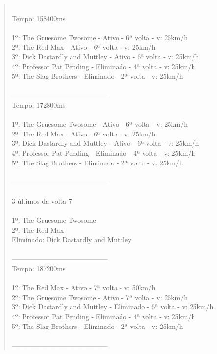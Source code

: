 \documentclass[paper=a4, fontsize=11pt]{scrartcl}
\numberwithin{equation}{section}		%
\numberwithin{figure}{section}			%
\numberwithin{table}{section}				%
\begin{document}
\begin{quote}
\\Tempo: 158400ms
\\
\\1º: The Gruesome Twosome - Ativo - 6ª volta - v: 25km/h
\\2º: The Red Max - Ativo - 6ª volta - v: 25km/h
\\3º: Dick Dastardly and Muttley - Ativo - 6ª volta - v: 25km/h
\\4º: Professor Pat Pending - Eliminado - 4ª volta - v: 25km/h
\\5º: The Slag Brothers - Eliminado - 2ª volta - v: 25km/h
\\
\\------------------------------------------
\\Tempo: 172800ms
\\
\\1º: The Gruesome Twosome - Ativo - 6ª volta - v: 25km/h
\\2º: The Red Max - Ativo - 6ª volta - v: 25km/h
\\3º: Dick Dastardly and Muttley - Ativo - 6ª volta - v: 25km/h
\\4º: Professor Pat Pending - Eliminado - 4ª volta - v: 25km/h
\\5º: The Slag Brothers - Eliminado - 2ª volta - v: 25km/h
\\
\\------------------------------------------
\\
\\3 últimos da volta 7
\\
\\1º: The Gruesome Twosome
\\2º: The Red Max
\\Eliminado: Dick Dastardly and Muttley
\\
\\------------------------------------------
\\Tempo: 187200ms
\\
\\1º: The Red Max - Ativo - 7ª volta - v: 50km/h
\\2º: The Gruesome Twosome - Ativo - 7ª volta - v: 25km/h
\\3º: Dick Dastardly and Muttley - Eliminado - 6ª volta - v: 25km/h
\\4º: Professor Pat Pending - Eliminado - 4ª volta - v: 25km/h
\\5º: The Slag Brothers - Eliminado - 2ª volta - v: 25km/h
\\
\\------------------------------------------

\end{quote}
\end{document}
